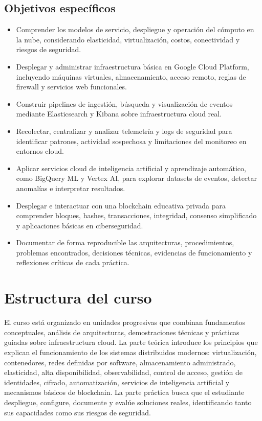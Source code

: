 \documentclass[
  coursetitle={Cómputo Nube y Tecnologías Emergentes},
  coursehours={96},
  coursedate={Verano 2026},
  doctype={Guía del curso},
  otherlangs={english,french},
  authorname={Lázaro},
  authorsurname={Bustio-Martínez},
  authortitle={PhD},
  role={Profesor Investigador},
  email={lbustio@inaoe.mx},
  phone={5559504000},
  ext={7459},
  institution={Instituto Nacional de Astrofísica, Óptica y Electrónica (INAOE)},
  department={Maestría en Ciencias en Tecnologías de Seguridad},
  address={Luis Enrique Erro 1, Sta. Ma. Tonantzintla, San Andrés Cholula, CP 72840, Puebla, México},
  margin={0.5in}
]{../../lbustio_lecture_notes}
\begin{document}
\subsection{Objetivos específicos}
\label{sec:objetivos_especificos}
\begin{itemize}
  \item Comprender los modelos de servicio, despliegue y operación del cómputo en la nube, considerando elasticidad, virtualización, costos, conectividad y riesgos de seguridad.
  \item Desplegar y administrar infraestructura básica en Google Cloud Platform, incluyendo máquinas virtuales, almacenamiento, acceso remoto, reglas de firewall y servicios web funcionales.
  \item Construir pipelines de ingestión, búsqueda y visualización de eventos mediante Elasticsearch y Kibana sobre infraestructura cloud real.
  \item Recolectar, centralizar y analizar telemetría y logs de seguridad para identificar patrones, actividad sospechosa y limitaciones del monitoreo en entornos cloud.
  \item Aplicar servicios cloud de inteligencia artificial y aprendizaje automático, como BigQuery ML y Vertex AI, para explorar datasets de eventos, detectar anomalías e interpretar resultados.
  \item Desplegar e interactuar con una blockchain educativa privada para comprender bloques, hashes, transacciones, integridad, consenso simplificado y aplicaciones básicas en ciberseguridad.
  \item Documentar de forma reproducible las arquitecturas, procedimientos, problemas encontrados, decisiones técnicas, evidencias de funcionamiento y reflexiones críticas de cada práctica.
\end{itemize}

\section{Estructura del curso}
\label{sec:estrucrtura}
El curso está organizado en unidades progresivas que combinan fundamentos conceptuales, análisis de arquitecturas, demostraciones técnicas y prácticas guiadas sobre infraestructura cloud. La parte teórica introduce los principios que explican el funcionamiento de los sistemas distribuidos modernos: virtualización, contenedores, redes definidas por software, almacenamiento administrado, elasticidad, alta disponibilidad, observabilidad, control de acceso, gestión de identidades, cifrado, automatización, servicios de inteligencia artificial y mecanismos básicos de blockchain. La parte práctica busca que el estudiante despliegue, configure, documente y evalúe soluciones reales, identificando tanto sus capacidades como sus riesgos de seguridad.
\end{document}

